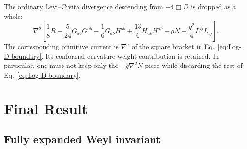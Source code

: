 \documentclass[11pt]{article}
\begin{document}
The ordinary Levi--Civita divergence descending from $-4\Box D$ is dropped as
a whole:
\begin{equation}
\nabla^2\!\left[
\frac18R-\frac5{24}G_{ab}G^{ab}-\frac16G_{ab}H^{ab}
+\frac{13}{6}H_{ab}H^{ab}-gN
-\frac{g^2}{4}L^{ij}L_{ij}\right].
\label{eq:Log-D-boundary}
\end{equation}
The corresponding primitive current is $\nabla^a$ of the square bracket in
Eq.~\eqref{eq:Log-D-boundary}.
Its conformal curvature-weight contribution is retained.  In particular, one
must not keep only the $-g\nabla^2N$ piece while discarding the rest of
Eq.~\eqref{eq:Log-D-boundary}.

\section{Final Result}
\label{sec:FinalResult}

\subsection{Fully expanded Weyl invariant}
\end{document}
